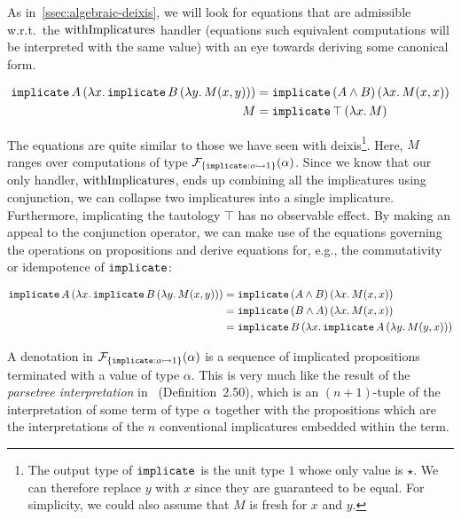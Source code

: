 As in~\ref{ssec:algebraic-deixis}, we will look for equations that are
admissible w.r.t.\ the $\operatorname{withImplicatures}$ handler (equations such equivalent
computations will be interpreted with the same value) with an eye towards
deriving some canonical form.

\begin{align*}
  \mathtt{implicate}\,A\,(\lambda x.\, \mathtt{implicate}\,B\,(\lambda y.\, M(x,y)))
  &= \mathtt{implicate}\,(A \land B)\,(\lambda x.\, M(x,x)) \\
  M &= \mathtt{implicate}\,\top\,(\lambda x.\, M)
\end{align*}

The equations are quite similar to those we have seen with
deixis\footnote{The output type of $\mathtt{implicate}$ is the unit type $1$
  whose only value is $\star$. We can therefore replace $y$ with $x$ since
  they are guaranteed to be equal. For simplicity, we could also assume
  that $M$ is fresh for $x$ and $y$.}. Here, $M$ ranges over computations
of type $\mathcal{F}_{\{ \mathtt{implicate} : o \rightarrowtail 1 \}}(\alpha)$. Since we know that
our only handler, $\operatorname{withImplicatures}$, ends up combining all the implicatures
using conjunction, we can collapse two implicatures into a single
implicature. Furthermore, implicating the tautology $\top$ has no
observable effect. By making an appeal to the conjunction operator, we can
make use of the equations governing the operations on propositions and
derive equations for, e.g., the commutativity or idempotence of
$\mathtt{implicate}$:

\begin{align*}
  \mathtt{implicate}\,A\,(\lambda x.\, \mathtt{implicate}\,B\,(\lambda y.\, M(x,y)))
  &= \mathtt{implicate}\,(A \land B)\,(\lambda x.\, M(x,x)) \\
  &= \mathtt{implicate}\,(B \land A)\,(\lambda x.\, M(x,x)) \\
  &= \mathtt{implicate}\,B\,(\lambda x.\, \mathtt{implicate}\,A\,(\lambda y.\, M(y,x)))
\end{align*}

A denotation in $\mathcal{F}_{\{ \mathtt{implicate} : o \rightarrowtail 1 \}}(\alpha)$ is a
sequence of implicated propositions terminated with a value of type
$\alpha$. This is very much like the result of the \emph{parsetree
  interpretation} in~\cite{potts2005logic} (Definition~2.50), which is an
$(n+1)$-tuple of the interpretation of some term of type $\alpha$ together
with the propositions which are the interpretations of the $n$ conventional
implicatures embedded within the term.

